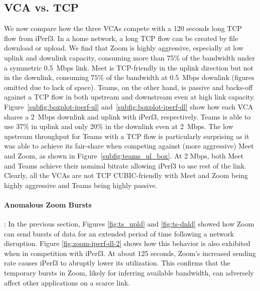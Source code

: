 \subsection{VCA vs. TCP}

We now compare how the three VCAs compete with a 120 seconds long TCP flow
from iPerf3. In a home network, a long TCP flow can be created by file
download or upload. We find that Zoom is highly aggressive,  especially at low
uplink and downlink capacity, consuming more than 75\% of the bandwidth under
a symmetric 0.5~Mbps link. Meet is TCP-friendly in the uplink direction but
not in the downlink, consuming $75\%$ of the bandwidth at 0.5~Mbps downlink
(figures omitted due to lack of space). Teams, on the other hand, is passive
and backs-off against a TCP flow in both upstream and downstream even at high
link capacity. Figure~\ref{subfig:boxplot-iperf-ul}
and~\ref{subfig:boxplot-iperf-dl} show how each VCA shares a 2~Mbps downlink
and uplink with iPerf3, respectively. Teams is able to use 37\% in uplink and
only 20\% in the downlink even at 2~Mbps. The low upstream throughput for
Teams with a TCP flow is particularly surprising as it was able to achieve its
fair-share when competing against (more aggressive) Meet and Zoom, as shown in Figure~\ref{subfig:teams_ul_box}. At 2 Mbps, both Meet and Teams achieve their nominal bitrate allowing iPerf3 to use rest of the link. Clearly, all the VCAs are not TCP CUBIC-friendly with Meet and Zoom being highly aggressive and Teams being highly passive. 


\paragraph{Anomalous Zoom Bursts}: In the previous section, Figures \ref{fig:ts_upld} and \ref{fig:ts-dnld} showed how Zoom can send bursts of data for an extended period of time following a network disruption. Figure \ref{fig:zoom-iperf-dl-2} shows how this behavior is also exhibited when in competition with iPerf3. At about 125 seconds, Zoom's increased sending rate causes iPerf3 to abruptly lower its utilization. This confirms that the temporary bursts in Zoom, likely for inferring available bandwidth, can adversely affect other applications on a scarce link. 



